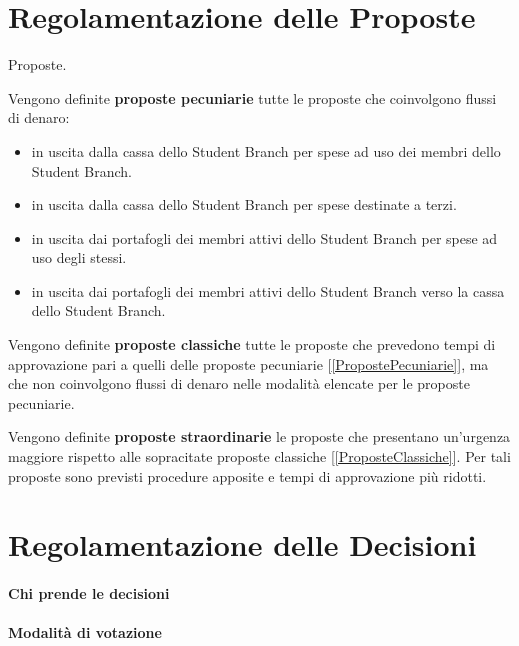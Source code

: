 \section{Regolamentazione delle Proposte}


\begin{defn}[Proposte]
	Proposte.
\end{defn}

\begin{defn}
	\label{PropostePecuniarie}
	Vengono definite \textbf{proposte pecuniarie} tutte le proposte che coinvolgono flussi di denaro:
	\begin{itemize}
		\item in uscita dalla cassa dello Student Branch per spese ad uso dei membri dello Student Branch.
		\item in uscita dalla cassa dello Student Branch per spese destinate a terzi.
		\item in uscita dai portafogli dei membri attivi dello Student Branch per spese ad uso degli stessi. %
		\item in uscita dai portafogli dei membri attivi dello Student Branch verso la cassa dello Student Branch.
	\end{itemize}
\end{defn}

\begin{defn}
	\label{ProposteClassiche}
	Vengono definite \textbf{proposte classiche} tutte le proposte che prevedono tempi di approvazione pari a quelli delle proposte pecuniarie [\ref{PropostePecuniarie}], ma che non coinvolgono flussi di denaro nelle modalità elencate per le proposte pecuniarie.
\end{defn}

\begin{defn}
	\label{ProposteStraordinarie}
	Vengono definite \textbf{proposte straordinarie} le proposte che presentano un'urgenza maggiore rispetto alle sopracitate proposte classiche [\ref{ProposteClassiche}]. Per tali proposte sono previsti procedure apposite e tempi di approvazione più ridotti.
\end{defn}


\section{Regolamentazione delle Decisioni}

\paragraph{Chi prende le decisioni}

\paragraph{Modalità di votazione}